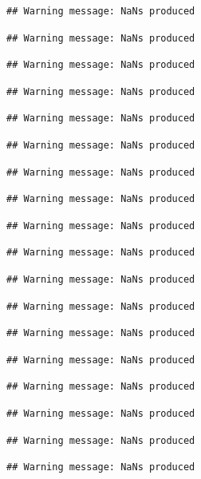 \documentclass{article}
\makeatletter
\newenvironment{kframe}{%
 \def\FrameCommand##1{\hskip\@totalleftmargin \hskip-\fboxsep
 \colorbox{shadecolor}{##1}\hskip-\fboxsep
     \hskip-\linewidth \hskip-\@totalleftmargin \hskip\columnwidth}%
 \MakeFramed {\advance\hsize-\width
   \@totalleftmargin\z@ \linewidth\hsize
   \@setminipage}}%
 {\par\unskip\endMakeFramed}
\newenvironment{knitrout}{}{} %
\makeatother
\begin{document}
\begin{knitrout}
{\begin{kframe}
\begin{verbatim}
## Warning message: NaNs produced
\end{verbatim}
\begin{verbatim}
## Warning message: NaNs produced
\end{verbatim}
\begin{verbatim}
## Warning message: NaNs produced
\end{verbatim}
\begin{verbatim}
## Warning message: NaNs produced
\end{verbatim}
\begin{verbatim}
## Warning message: NaNs produced
\end{verbatim}
\begin{verbatim}
## Warning message: NaNs produced
\end{verbatim}
\begin{verbatim}
## Warning message: NaNs produced
\end{verbatim}
\begin{verbatim}
## Warning message: NaNs produced
\end{verbatim}
\begin{verbatim}
## Warning message: NaNs produced
\end{verbatim}
\begin{verbatim}
## Warning message: NaNs produced
\end{verbatim}
\begin{verbatim}
## Warning message: NaNs produced
\end{verbatim}
\begin{verbatim}
## Warning message: NaNs produced
\end{verbatim}
\begin{verbatim}
## Warning message: NaNs produced
\end{verbatim}
\begin{verbatim}
## Warning message: NaNs produced
\end{verbatim}
\begin{verbatim}
## Warning message: NaNs produced
\end{verbatim}
\begin{verbatim}
## Warning message: NaNs produced
\end{verbatim}
\begin{verbatim}
## Warning message: NaNs produced
\end{verbatim}
\begin{verbatim}
## Warning message: NaNs produced
\end{verbatim}

\end{kframe}}
\end{knitrout}
\end{document}
